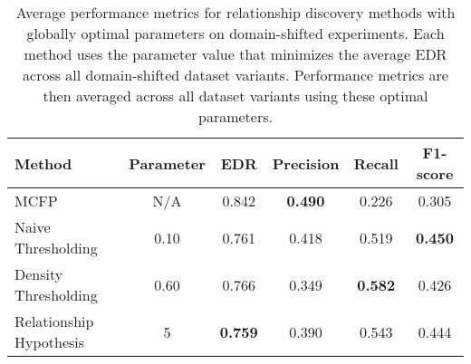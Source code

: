 \begin{table}[ht]
\centering
\caption{Average performance metrics for relationship discovery methods with globally optimal parameters on domain-shifted experiments. Each method uses the parameter value that minimizes the average EDR across all domain-shifted dataset variants. Performance metrics are then averaged across all dataset variants using these optimal parameters.}
\label{tab:relationship_methods_global_optimal_domain_shifted}
\begin{tabular}{lccccc}
\toprule
Method & Parameter & EDR & Precision & Recall & F1-score \\
\midrule
MCFP & N/A & 0.842 & \textbf{0.490} & 0.226 & 0.305 \\
Naive Thresholding & 0.10 & 0.761 & 0.418 & 0.519 & \textbf{0.450} \\
Density Thresholding & 0.60 & 0.766 & 0.349 & \textbf{0.582} & 0.426 \\
Relationship Hypothesis & 5 & \textbf{0.759} & 0.390 & 0.543 & 0.444 \\
\bottomrule
\end{tabular}
\end{table}
